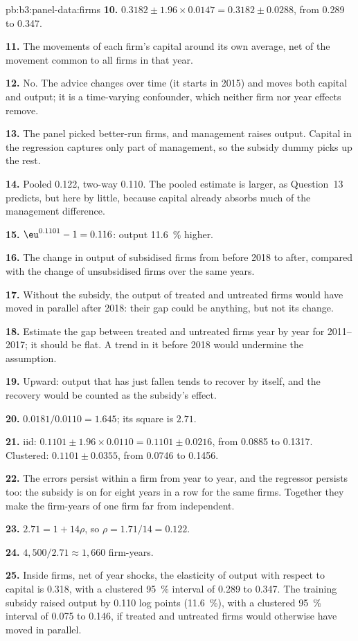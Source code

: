 \begin{solution}{pb:b3:panel-data:firms}
\textbf{10.} $0.3182 \pm 1.96 \times 0.0147 = 0.3182 \pm 0.0288$, from 0.289 to
0.347.

\textbf{11.} The movements of each firm's capital around its own average, net of
the movement common to all firms in that year.

\textbf{12.} No. The advice changes over time (it starts in 2015) and moves both
capital and output; it is a time-varying confounder, which neither firm nor year
effects remove.

\textbf{13.} The panel picked better-run firms, and management raises output.
Capital in the regression captures only part of management, so the subsidy
dummy picks up the rest.

\textbf{14.} Pooled 0.122, two-way 0.110. The pooled estimate is larger, as
Question~13 predicts, but here by little, because capital already absorbs much
of the management difference.

\textbf{15.} $\eu^{0.1101} - 1 = 0.116$: output 11.6~\% higher.

\textbf{16.} The change in output of subsidised firms from before 2018 to after,
compared with the change of unsubsidised firms over the same years.

\textbf{17.} Without the subsidy, the output of treated and untreated firms would
have moved in parallel after 2018: their gap could be anything, but not its
change.

\textbf{18.} Estimate the gap between treated and untreated firms year by year
for 2011--2017; it should be flat. A trend in it before 2018 would undermine the
assumption.

\textbf{19.} Upward: output that has just fallen tends to recover by itself, and
the recovery would be counted as the subsidy's effect.

\textbf{20.} $0.0181/0.0110 = 1.645$; its square is $2.71$.

\textbf{21.} iid: $0.1101 \pm 1.96 \times 0.0110 = 0.1101 \pm 0.0216$, from
0.0885 to 0.1317. Clustered: $0.1101 \pm 0.0355$, from 0.0746 to 0.1456.

\textbf{22.} The errors persist within a firm from year to year, and the
regressor persists too: the subsidy is on for eight years in a row for the same
firms. Together they make the firm-years of one firm far from independent.

\textbf{23.} $2.71 = 1 + 14\rho$, so $\rho = 1.71/14 = 0.122$.

\textbf{24.} $4{,}500/2.71 \approx 1{,}660$ firm-years.

\textbf{25.} Inside firms, net of year shocks, the elasticity of output with
respect to capital is 0.318, with a clustered 95~\% interval of 0.289 to 0.347.
The training subsidy raised output by 0.110 log points (11.6~\%), with a
clustered 95~\% interval of 0.075 to 0.146, if treated and untreated firms would
otherwise have moved in parallel.
\end{solution}
